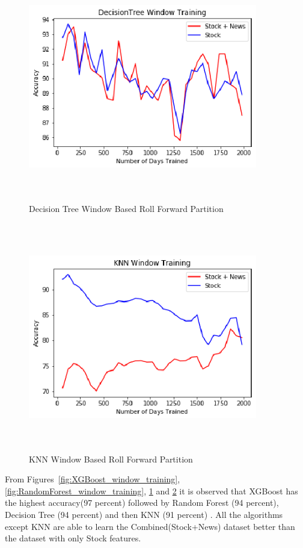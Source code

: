 \documentclass[preprint,12pt]{elsarticle}
\begin{document}
\begin{figure}[H]
\centering
\includegraphics[width=10cm,height=10cm,keepaspectratio]{DecisionTree_Window_Training_Acc.eps}
\caption{\label{fig:DecisionTree_window_training} Decision Tree Window Based Roll Forward Partition}
\end{figure}

\begin{figure}[H]
\centering
\includegraphics[width=10cm,height=10cm,keepaspectratio]{KNN_Window_Training_Acc.eps}
\caption{\label{fig:KNN_window_training} KNN Window Based Roll Forward Partition}
\end{figure}

From Figures~\ref{fig:XGBoost_window_training}, \ref{fig:RandomForest_window_training}, \ref{fig:DecisionTree_window_training} and  \ref{fig:KNN_window_training} it is observed that XGBoost has the highest accuracy(97 percent) followed by Random Forest (94 percent), Decision Tree (94 percent) and then KNN (91 percent) . All the algorithms except KNN are able to learn the Combined(Stock+News) dataset better than the dataset with only Stock features. 
\end{document}

